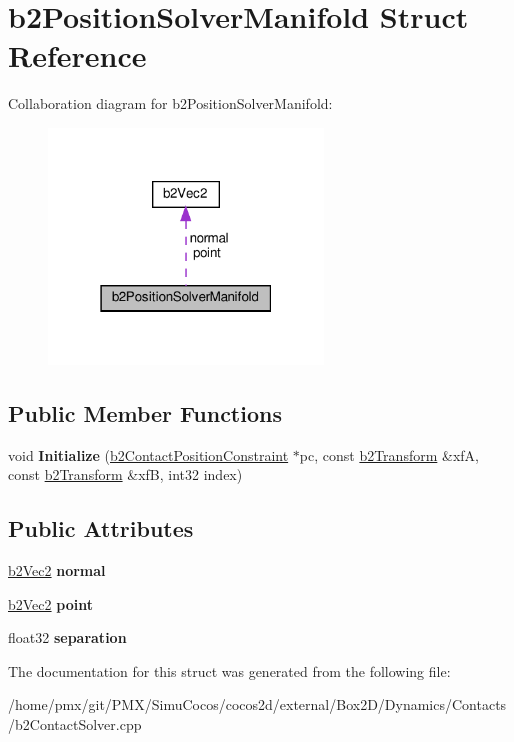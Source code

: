 \hypertarget{structb2PositionSolverManifold}{}\section{b2\+Position\+Solver\+Manifold Struct Reference}
\label{structb2PositionSolverManifold}


Collaboration diagram for b2\+Position\+Solver\+Manifold\+:
\nopagebreak
\begin{figure}[H]
\begin{center}
\leavevmode
\includegraphics[width=207pt]{structb2PositionSolverManifold__coll__graph}
\end{center}
\end{figure}
\subsection*{Public Member Functions}
\begin{DoxyCompactItemize}
\item 
\mbox{\label{structb2PositionSolverManifold_affdfc2c9f455008e865b2dd6947796fa}} 
void {\bfseries Initialize} (\hyperlink{structb2ContactPositionConstraint}{b2\+Contact\+Position\+Constraint} $\ast$pc, const \hyperlink{structb2Transform}{b2\+Transform} \&xfA, const \hyperlink{structb2Transform}{b2\+Transform} \&xfB, int32 index)
\end{DoxyCompactItemize}
\subsection*{Public Attributes}
\begin{DoxyCompactItemize}
\item 
\mbox{\label{structb2PositionSolverManifold_a4a1073e69ab49f55b7013d4aef96fe1c}} 
\hyperlink{structb2Vec2}{b2\+Vec2} {\bfseries normal}
\item 
\mbox{\label{structb2PositionSolverManifold_a9b7a88173cc0295e2883e2ac8b7c46f2}} 
\hyperlink{structb2Vec2}{b2\+Vec2} {\bfseries point}
\item 
\mbox{\label{structb2PositionSolverManifold_a9dd76b0c774238d3e3745d139cf6eea4}} 
float32 {\bfseries separation}
\end{DoxyCompactItemize}


The documentation for this struct was generated from the following file\+:\begin{DoxyCompactItemize}
\item 
/home/pmx/git/\+P\+M\+X/\+Simu\+Cocos/cocos2d/external/\+Box2\+D/\+Dynamics/\+Contacts/b2\+Contact\+Solver.\+cpp\end{DoxyCompactItemize}

